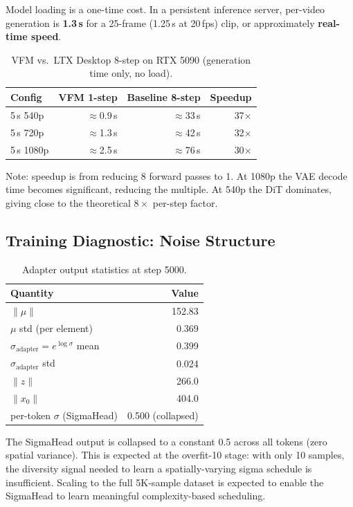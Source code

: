 \documentclass[10pt,twocolumn]{article}
\begin{document}
Model loading is a one-time cost. In a persistent inference server, per-video generation is \textbf{1.3\,s} for a 25-frame (1.25\,s at 20\,fps) clip, or approximately \textbf{real-time speed}.

\begin{table}[h]
\centering
\caption{VFM vs.\ LTX Desktop 8-step on RTX 5090 (generation time only, no load).}
\label{tab:speedup}
\begin{tabular}{@{}lrrr@{}}
\toprule
Config & VFM 1-step & Baseline 8-step & Speedup \\
\midrule
5\,s 540p & $\approx$0.9\,s & $\approx$33\,s & 37$\times$ \\
5\,s 720p & $\approx$1.3\,s & $\approx$42\,s & 32$\times$ \\
5\,s 1080p & $\approx$2.5\,s & $\approx$76\,s & 30$\times$ \\
\bottomrule
\end{tabular}
\end{table}

Note: speedup is from reducing 8 forward passes to 1. At 1080p the VAE decode time becomes significant, reducing the multiple. At 540p the DiT dominates, giving close to the theoretical $8\times$ per-step factor.

\subsection{Training Diagnostic: Noise Structure}

\begin{table}[h]
\centering
\caption{Adapter output statistics at step 5000.}
\label{tab:adapter_stats}
\begin{tabular}{@{}lr@{}}
\toprule
Quantity & Value \\
\midrule
$\|\mu\|$ & 152.83 \\
$\mu$ std (per element) & 0.369 \\
$\sigma_{\text{adapter}} = e^{\log\sigma}$ mean & 0.399 \\
$\sigma_{\text{adapter}}$ std & 0.024 \\
$\|z\|$ & 266.0 \\
$\|x_0\|$ & 404.0 \\
per-token $\sigma$ (SigmaHead) & 0.500 (collapsed) \\
\bottomrule
\end{tabular}
\end{table}

The SigmaHead output is collapsed to a constant 0.5 across all tokens (zero spatial variance). This is expected at the overfit-10 stage: with only 10 samples, the diversity signal needed to learn a spatially-varying sigma schedule is insufficient. Scaling to the full 5K-sample dataset is expected to enable the SigmaHead to learn meaningful complexity-based scheduling.
\end{document}
